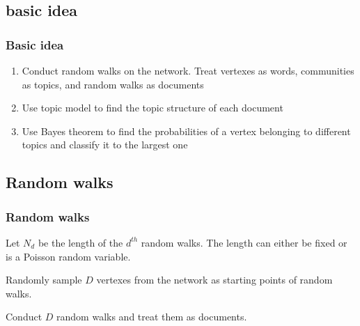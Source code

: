 \documentclass{beamer}
\begin{document}
\subsection{basic idea}
\begin{frame}
\frametitle{Basic idea}
\begin{enumerate}
	\item Conduct random walks on the network. Treat vertexes as words, communities as topics, and random walks as documents
	\item Use topic model to find the topic structure of each document
	\item Use Bayes theorem to find the probabilities of a vertex belonging to different topics and classify it to the largest one
\end{enumerate}
\end{frame}

\subsection{Random walks}
\begin{frame}
\frametitle{Random walks}
Let $N_d$ be the length of the $d^{th}$ random walks. The length can either be fixed or is a Poisson random variable.\\
\vspace{3mm}

Randomly sample $D$ vertexes from the network as starting points of random walks.\\
\vspace{3mm}

Conduct $D$ random walks and treat them as documents. 
\end{frame}
\end{document}
